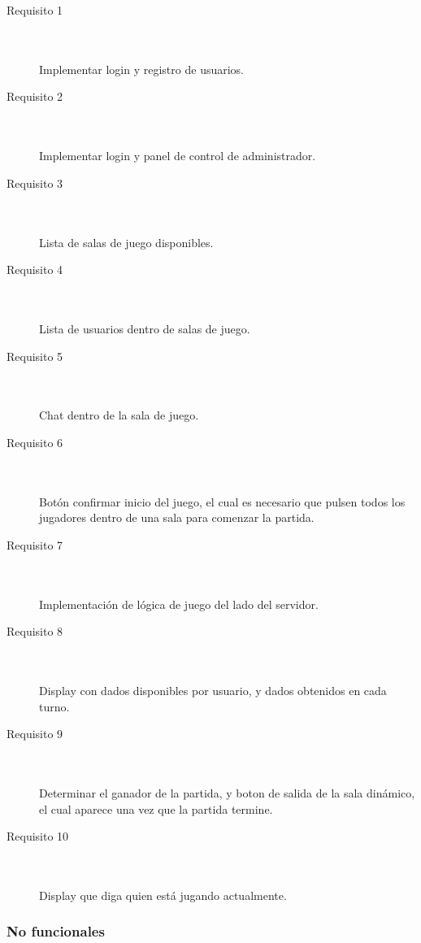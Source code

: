 \documentclass[a4paper,11pt]{article}
\begin{document}
\begin{description}
	\item[Requisito 1] \hfill \\ \\
	Implementar login y registro de usuarios.
	\item[Requisito 2] \hfill \\ \\
	Implementar login y panel de control de administrador.
	\item[Requisito 3] \hfill \\ \\
	Lista de salas de juego disponibles.
	\item[Requisito 4] \hfill \\ \\
	Lista de usuarios dentro de salas de juego.
	\item[Requisito 5] \hfill \\ \\
	Chat dentro de la sala de juego.
	\item[Requisito 6] \hfill \\ \\
	Botón confirmar inicio del juego, el cual es necesario que pulsen
	todos los jugadores dentro de una sala para comenzar la partida.
	\item[Requisito 7] \hfill \\ \\
	Implementación de lógica de juego del lado del servidor.
	\item[Requisito 8] \hfill \\ \\
	Display con dados disponibles por usuario, y dados obtenidos en cada 
	turno.
	\item[Requisito 9] \hfill \\ \\
	Determinar el ganador de la partida, y boton de salida de la sala
	dinámico, el cual aparece una vez que la partida termine.
	\item[Requisito 10] \hfill \\ \\
	Display que diga quien está jugando actualmente.
\end{description}

\subsubsection{No funcionales}
\end{document}
